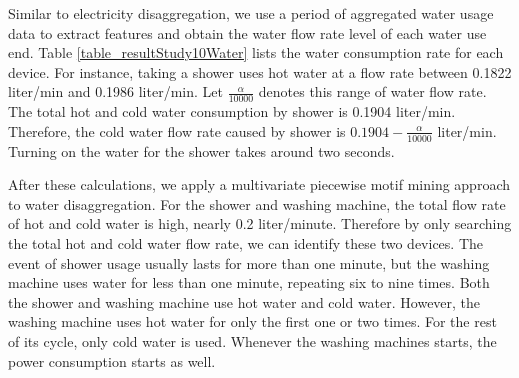 Similar to electricity disaggregation, we use a period of aggregated water usage 
data to extract features  
and obtain the water flow rate level of each water use end.
Table \ref{table_resultStudy10Water} lists the water consumption rate for each device. 
For instance, taking a shower uses hot water at a flow rate between 0.1822 liter/min and 0.1986 liter/min. 
Let $\frac{\alpha}{10000}$ denotes this range of water flow rate.
The total hot and cold water consumption by  shower is 0.1904 liter/min. 
Therefore, the cold water flow rate caused by shower is $0.1904-\frac{\alpha}{10000}$ liter/min. 
Turning on the water for the shower takes around two seconds. 
%
\begin{table}[h]
\renewcommand{\arraystretch}{1.3}
\end{table}

After these calculations, we apply a multivariate piecewise motif mining approach to 
water disaggregation. 
For the shower and washing machine, 
the total flow rate of hot and cold water is high,  nearly 0.2 liter/minute. 
Therefore by only searching the 
total hot and cold water flow rate, we can identify these two devices. 
The event of shower usage usually lasts for more than one minute, 
but the washing machine uses water for less than one minute, 
repeating six to nine times. 
Both the shower and washing machine use 
hot water and cold water. 
However, the washing machine uses hot water for only the 
first one or two times. For the rest of its cycle, 
only cold water is used. 
Whenever the washing machines starts, 
the power consumption starts as well. 

